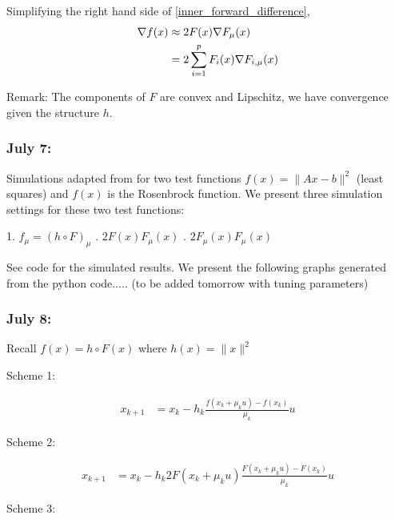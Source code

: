 \documentclass{article}
\begin{document}
Simplifying the right hand side of \eqref{inner_forward_difference}, 
\begin{align}
\nabla f(x) &  \approx 2F(x)\nabla F_{\mu}(x) \notag \\ & = 2\sum_{i=1}^p F_i(x)\nabla F_{i,\mu}(x)
\end{align} 

Remark: The components of $F$ are convex and Lipschitz, we have convergence given the structure $h$. \newline 

\subsubsection{July 7:}  

Simulations adapted from \cite{Nesterov2015} for two test functions $f(x) = \|Ax - b\|^2$ (least squares) and $f(x)$ is the Rosenbrock function. We present three simulation settings for these two test functions: \newline 

1. $f_{\mu} = (h \circ F)_{\mu}$ . $2F(x)F_{\mu}(x)$ . $2F_{\mu}(x)F_{\mu}(x)$ \newline 

See code for the simulated results. We present the following graphs generated from the python code..... (to be added tomorrow with tuning parameters)


\subsubsection{July 8:}  

Recall $f(x) = h \circ F(x)$ where $h(x) = \|x\|^2$ \newline 

\label{scheme_composite_struct}

Scheme 1:  \newline 

\begin{align}
x_{k+1} & = x_k - h_k \frac{f(x_k + \mu_ku) - f(x_k)}{\mu_k}u
\end{align}

Scheme 2: 

\begin{align}
x_{k+1} & = x_k - h_k 2F(x_k+\mu_k u)\frac{F(x_k+\mu_k u) - F(x_k)}{\mu_k}u
\end{align}

Scheme 3:
\end{document}
